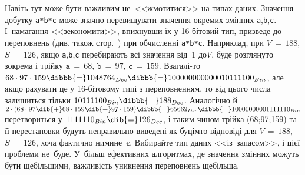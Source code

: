 Навіть тут може бути важливим не~<<жмотитися>> на типах даних. Значення добутку \texttt{a*b*c} може значно перевищувати значення окремих змінних \texttt{a},\nolinebreak[2] \texttt{b},\nolinebreak[3] \texttt{c}. І~намагання <<зекономити>>, впихнувши їх у \mbox{16-біто}\-вий тип, призведе до переповнень (див. також стор.~\pageref{text:overflow-example}) при обчисленні \texttt{a*b*c}. Наприклад, при 
${V\,{=}\,188}$,
${S\,{=}\,126}$,
якщо \texttt{a},\nolinebreak[2] \texttt{b},\nolinebreak[3] \texttt{c} перебирають всі значення від~1 до\nolinebreak[3] $V$, буде розглянуто 
зокрема і 
трійку 
${\texttt{a}\,{=}\,68}$,
${\texttt{b}\,{=}\,97}$,
${\texttt{c}\,{=}\,159}$.
Взагалі-то ${68\cdot97\cdot159}\dibbb{{=}}1048764_{Dec}\dibbb{{=}}100000000000010111100_{Bin}$, але якщо рахувати це у \mbox{16-біто}\-вому типі з переповненням, то від цього числа залишиться тільки $10111100_{Bin}\dibbb{{=}}188_{Dec}$. Аналогічно й  
$2\cdot(
68\cdot97\dib{{+}}
68\cdot159\dib{{+}}
97\cdot159)\dibbb{{=}}65662_{{Dec}}\dibbb{{=}}10000000001111110_{Bin}$ перетвориться у $1111110_{Bin}\dib{{=}}126_{Dec}$, і таким чином трійка (68;97;159) та її перестановки будуть неправильно виведені як буцімто відповіді для 
${V\,{=}\,188}$,
${S\,{=}\,126}$,
хоча фактично ними\nolinebreak[2] не~є. Вибирайте тип даних <<із~запасом>>, і цієї проблеми не~буде.
У~більш ефективних алгоритмах, де значення змінних можуть бути ще\nolinebreak[3] більшими, важливість уникнення переповнень ще\nolinebreak[3] більша.

